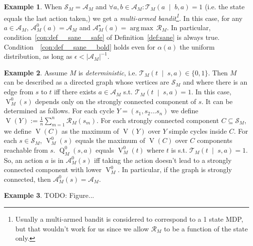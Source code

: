\documentclass[11pt]{article}
\theoremstyle{definition}
\newtheorem{example}{Example}%
\theoremstyle{plain}
\newcommand{\AP}[1]{\left(#1\right)}
\newcommand{\APM}[2]{\left(#1\;\middle\vert\;#2\right)}
\newcommand{\Argmax}[1]{\underset{#1}{\operatorname{arg\,max}}\,}
\newcommand{\Abs}[1]{\left\vert #1 \right\vert}
\newcommand{\A}{\mathcal{A}}
\newcommand{\St}{\mathcal{S}}
\newcommand{\T}{\mathcal{T}}
\newcommand{\R}{\mathcal{R}}
\newcommand{\V}{\operatorname{V}}
\newcommand{\Q}{\operatorname{Q}}
\begin{document}
\begin{samepage}
\begin{example}

When $\St_M=\A_M$ and $\forall a,b \in \A_M: \T_M\APM{a}{b,a}=1$ (i.e. the state equals the last action taken,) we get a \emph{multi-armed bandit\footnote{Usually a multi-armed bandit is considered to correspond to a 1 state MDP, but that wouldn't work for us since we allow $\R_M$ to be a function of the state only.}.} In this case, for any $a\in\A_M$, $\A_M^0(a) = \A_M$ and $\A_M^\star(a)=\Argmax{}{\R_M}$. In particular, condition~\ref{con:def__sane__safe} of Definition~\ref{def:sane} is always true. Condition~~\ref{con:def__sane__bold} holds even for $\alpha(a)$ the uniform distribution, as long as $\epsilon < \Abs{\A_M}^{-1}$.

\end{example}
\end{samepage}

\begin{samepage}
\begin{example}

Assume $M$ is \emph{deterministic}, i.e. $\T_M\APM{t}{s,a}\in\{0,1\}$. Then $M$ can be described as a directed graph whose vertices are $\St_M$ and where there is an edge from $s$ to $t$ iff there exists $a\in\A_M$ s.t. $\T_M\APM{t}{s,a}=1$. In this case, $\V_M^0(s)$ depends only on the strongly connected component of $s$. It can be determined as follows. For each cycle $Y=\AP{s_1, s_2 \ldots s_n}$ we define $\V(Y):=\frac{1}{n}\sum_{m=1}^n \R_M\AP{s_m}$. For each strongly connected component $C \subseteq \St_M$, we define $\V(C)$ as the maximum of $\V(Y)$ over $Y$ simple cycles inside $C$. For each $s\in\St_M$, $\V_M^0(s)$ equals the maximum of $\V(C)$ over $C$ components reachable from $s$. $\Q_M^0(s,a)$ equals $\V_M^0(t)$ where $t$ is s.t. $\T_M\APM{t}{s,a}=1$. So, an action $a$ is in $\A_M^0(s)$ iff taking the action doesn't lead to a strongly connected component with lower $\V_M^0$. In particular, if the graph is strongly connected, then $\A_M^0(s)=\A_M$.

\end{example}
\end{samepage}

\begin{samepage}
\begin{example}

TODO: Figure...

\end{example}
\end{samepage}
\end{document}
